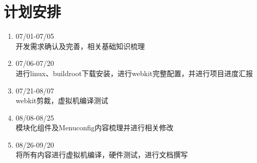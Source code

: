 \documentclass[UTF8,14pt]{article}
\numberwithin{figure}{section}
\begin{document}
\section{计划安排}
\begin{enumerate}
	\item 07/01-07/05\\
	      开发需求确认及完善，相关基础知识梳理
	\item 07/06-07/20\\
	      进行linux、buildroot下载安装，进行webkit完整配置，并进行项目进度汇报
	\item 07/21-08/07\\
	      webkit剪裁，虚拟机编译测试
	\item 08/08-08/25\\
	      模块化组件及Menuconfig内容梳理并进行相关修改
	\item 08/26-09/20\\
	      将所有内容进行虚拟机编译，硬件测试，进行文档撰写
\end{enumerate}
\end{document}
